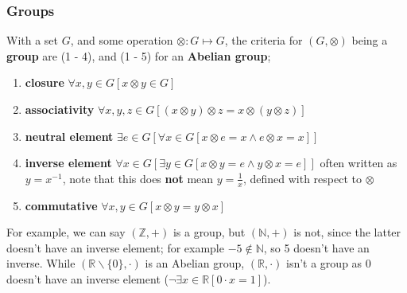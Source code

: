\documentclass[a4paper, 12pt]{article}
\begin{document}
            \subsubsection*{Groups}
                With a set $G$, and some operation $\otimes : G \mapsto G$, the criteria for $(G, \otimes)$ being a \textbf{group} are (1 - 4), and (1 - 5) for an \textbf{Abelian group};
                \begin{enumerate}[1.]
                    \itemsep0em
                    \item \textbf{closure} \hfill $\forall x, y \in G [x \otimes y \in G]$
                    \item \textbf{associativity} \hfill $\forall x, y, z \in G [(x \otimes y) \otimes z = x \otimes (y \otimes z)]$
                    \item \textbf{neutral element} \hfill $\exists e \in G [\forall x \in G [x \otimes e = x \land e \otimes x = x]]$
                    \item \textbf{inverse element} \hfill $\forall x \in G [\exists y \in G [x \otimes y = e \land y \otimes x = e]]$
                        \subitem often written as $y = x^{-1}$, note that this does \textbf{not} mean $y = \frac{1}{x}$, defined with respect to $\otimes$
                    \item \textbf{commutative} \hfill $\forall x, y \in G [x \otimes y = y \otimes x]$
                \end{enumerate}
                For example, we can say $(\mathbb{Z}, +)$ is a group, but $(\mathbb{N}, +)$ is not, since the latter doesn't have an inverse element; for example $-5 \notin \mathbb{N}$, so 5 doesn't have an inverse. While $(\mathbb{R}\backslash\{0\}, \cdot)$ is an Abelian group, $(\mathbb{R}, \cdot)$ isn't a group as 0 doesn't have an inverse element ($\neg \exists x \in \mathbb{R} [0 \cdot x = 1]$).
\end{document}
